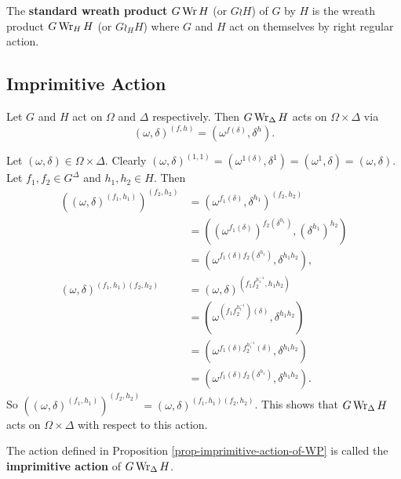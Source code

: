 \begin{definition}
	The \textbf{standard wreath product} $G\operatorname{Wr} H$ (or $G\wr H$) of $G$ by $H$ is the wreath product $G\operatorname{Wr}_H H$ (or $G\wr_H H$) where $G$ and $H$ act on themselves by right regular action.
\end{definition}

\subsection{Imprimitive Action}
\begin{proposition} \label{prop-imprimitive-action-of-WP}
	Let $G$ and $H$ act on $\Omega$ and $\Delta$ respectively. Then $G\operatorname{Wr}_\Delta H$  acts on $\Omega\times \Delta$ via
	\begin{equation*}
		(\omega,\delta)^{(f,h)} = (\omega^{f(\delta)},\delta^h).
	\end{equation*} 
\end{proposition}
\begin{sketch}
	Let $(\omega,\delta)\in \Omega\times \Delta$. 
	Clearly $(\omega,\delta)^{(1,1)} =  (\omega^{1(\delta)},\delta^1) = (\omega^{1},\delta) = (\omega,\delta)$. Let $f_1,f_2\in G^\Delta$ and $h_1,h_2\in H$. Then  
\begin{align*}
	((\omega,\delta)^{(f_1,h_1)})^{(f_2,h_2)} &= (\omega^{f_1(\delta)},\delta^{h_1})^{(f_2,h_2)} 
	\\
	&= ((\omega^{f_1(\delta)})^{f_2(\delta^{h_1})},(\delta^{h_1})^{h_2})
	\\
	&= (\omega^{f_1(\delta)f_2(\delta^{h_1})},\delta^{h_1h_2}),
	\\
	(\omega,\delta)^{(f_1,h_1)(f_2,h_2)} &= (\omega,\delta)^{(f_1f_2^{h_1^{-1}},h_1h_2)}
	\\
	&= (\omega^{(f_1f_2^{h_1^{-1}})(\delta)},\delta^{h_1h_2})
	\\
	&= (\omega^{f_1(\delta)f_2^{h_1^{-1}}(\delta)},\delta^{h_1h_2})
	\\
	&= (\omega^{f_1(\delta)f_2(\delta^{h_1})},\delta^{h_1h_2}).
\end{align*}
So $((\omega,\delta)^{(f_1,h_1)})^{(f_2,h_2)}  = (\omega,\delta)^{(f_1,h_1)(f_2,h_2)}$. This shows that $G\operatorname{Wr}_{\Delta} H$ acts on $\Omega\times \Delta$ with respect to this action.
\end{sketch}
\begin{definition}
	The action defined in Proposition \ref{prop-imprimitive-action-of-WP} is called the \textbf{imprimitive action} of $G\operatorname{Wr}_{\Delta} H$.
\end{definition}

